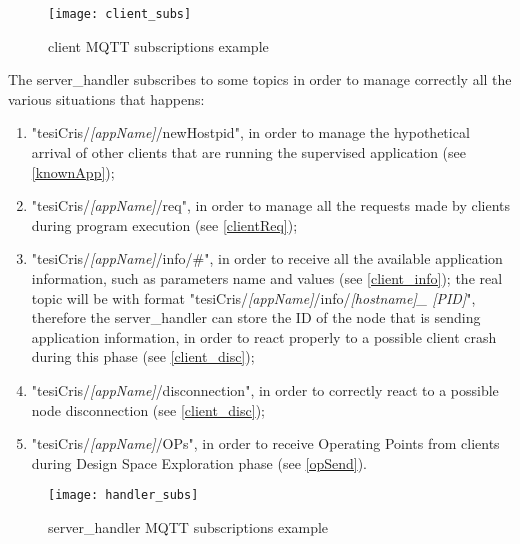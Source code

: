 \begin{figure}[H]

    \centering
    \texttt{[image: client\_subs]}
    \caption{client MQTT subscriptions example}
    
\end{figure}

The server\_handler subscribes to some topics in order to manage correctly all the various situations that happens:

\begin{enumerate}

    \item "tesiCris/\textit{[appName]}/newHostpid", in order to manage the hypothetical arrival of other clients that are running the supervised application (see \ref{knownApp});
    
    \item "tesiCris/\textit{[appName]}/req", in order to manage all the requests made by clients during program execution (see \ref{clientReq});
    
    \item "tesiCris/\textit{[appName]}/info/\#", in order to receive all the available application information, such as parameters name and values (see \ref{client_info}); the real topic will be with format "tesiCris\slash{}\textit{[appName]}\slash{}info\slash{}\textit{[host\-name]\_ [PID]}", therefore the server\_handler can store the ID of the node that is sending application information, in order to react properly to a possible client crash during this phase (see \ref{client_disc});
    
    \item "tesiCris/\textit{[appName]}/disconnection", in order to correctly react to a possible node disconnection (see \ref{client_disc});
    
    \item "tesiCris/\textit{[appName]}/OPs", in order to receive Operating Points from clients during Design Space Exploration phase (see \ref{opSend}).

\end{enumerate}

\begin{figure}[H]

    \centering
    \texttt{[image: handler\_subs]}
    \caption{server\_handler MQTT subscriptions example}
    
\end{figure}


